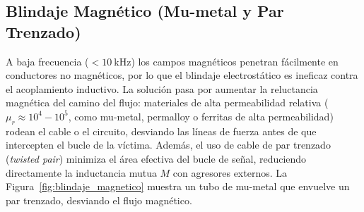 \begin{marginfigure}
    \centering
    \caption[Blindaje electrostático de un cable de señal.]{Blindaje electrostático (jaula de Faraday). El conductor de señal está rodeado por una pantalla conductora que desvía las líneas de campo eléctrico; la conexión a tierra en un solo extremo evita los bucles de tierra.}\label{fig:blindaje_electrostatico}
\end{marginfigure}

\subsection{Blindaje Magnético (Mu-metal y Par Trenzado)}\label{sub:blindaje_magnetico}
A baja frecuencia ($<\SI{10}{\kilo\hertz}$) los campos magnéticos penetran fácilmente en conductores no magnéticos, por lo que el blindaje electrostático es ineficaz contra el acoplamiento inductivo. La solución pasa por aumentar la reluctancia magnética del camino del flujo: materiales de alta permeabilidad relativa ($\mu_r \approx 10^4\!-\!10^5$, como mu-metal, permalloy o ferritas de alta permeabilidad) rodean el cable o el circuito, desviando las líneas de fuerza antes de que intercepten el bucle de la víctima. Además, el uso de cable de par trenzado (\textit{twisted pair}) minimiza el área efectiva del bucle de señal, reduciendo directamente la inductancia mutua $M$ con agresores externos. La Figura~\ref{fig:blindaje_magnetico} muestra un tubo de mu-metal que envuelve un par trenzado, desviando el flujo magnético.


